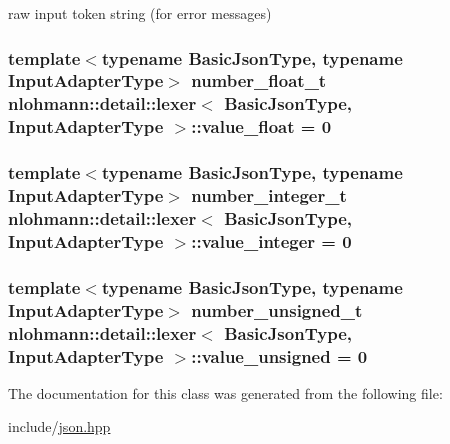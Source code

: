 raw input token string (for error messages) 

\subsubsection[{\texorpdfstring{value\+\_\+float}{value_float}}]{\setlength{\rightskip}{0pt plus 5cm}template$<$typename Basic\+Json\+Type, typename Input\+Adapter\+Type$>$ {\bf number\+\_\+float\+\_\+t} {\bf nlohmann\+::detail\+::lexer}$<$ Basic\+Json\+Type, Input\+Adapter\+Type $>$\+::value\+\_\+float = 0\hspace{0.3cm}{\ttfamily [private]}}\hypertarget{classnlohmann_1_1detail_1_1lexer_a0d74bb18ba7d32ea7e7c9d9a7d6c2e70}{}\label{classnlohmann_1_1detail_1_1lexer_a0d74bb18ba7d32ea7e7c9d9a7d6c2e70}
\subsubsection[{\texorpdfstring{value\+\_\+integer}{value_integer}}]{\setlength{\rightskip}{0pt plus 5cm}template$<$typename Basic\+Json\+Type, typename Input\+Adapter\+Type$>$ {\bf number\+\_\+integer\+\_\+t} {\bf nlohmann\+::detail\+::lexer}$<$ Basic\+Json\+Type, Input\+Adapter\+Type $>$\+::value\+\_\+integer = 0\hspace{0.3cm}{\ttfamily [private]}}\hypertarget{classnlohmann_1_1detail_1_1lexer_a5134de850fab8f41474a36ae07998088}{}\label{classnlohmann_1_1detail_1_1lexer_a5134de850fab8f41474a36ae07998088}
\subsubsection[{\texorpdfstring{value\+\_\+unsigned}{value_unsigned}}]{\setlength{\rightskip}{0pt plus 5cm}template$<$typename Basic\+Json\+Type, typename Input\+Adapter\+Type$>$ {\bf number\+\_\+unsigned\+\_\+t} {\bf nlohmann\+::detail\+::lexer}$<$ Basic\+Json\+Type, Input\+Adapter\+Type $>$\+::value\+\_\+unsigned = 0\hspace{0.3cm}{\ttfamily [private]}}\hypertarget{classnlohmann_1_1detail_1_1lexer_ae84cbf312215c15d79783380b1592f74}{}\label{classnlohmann_1_1detail_1_1lexer_ae84cbf312215c15d79783380b1592f74}


The documentation for this class was generated from the following file\+:\begin{DoxyCompactItemize}
\item 
include/\hyperlink{json_8hpp}{json.\+hpp}\end{DoxyCompactItemize}
